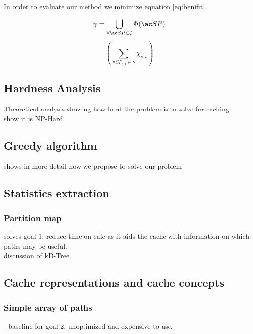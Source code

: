In order to evaluate our method we minimize equation \ref{eq:benifit}.



\begin{equation}
 \gamma = \bigcup\limits_{\forall \spath \in \zeta} \Phi(\spath) \\
\end{equation}
\begin{equation} 
\left(\sum\limits_{\forall SP_{s,t} \in \gamma} \chi_{s,t} \right) 
\end{equation}


\subsection{Hardness Analysis}
Theoretical analysis showing how hard the problem is to solve for \spath caching.\\
show it is NP-Hard
 

\subsection{Greedy algorithm}
shows in more detail how we propose to solve our problem


\subsection{Statistics extraction}

\subsubsection{Partition map} 
solves goal 1. reduce time on \spath calc as it aids the cache with information on which paths may be useful.\\ 
discussion of kD-Tree.


\subsection{Cache representations and cache concepts} 

\subsubsection{Simple array of paths} - baseline for goal 2, unoptimized and expensive to use.

